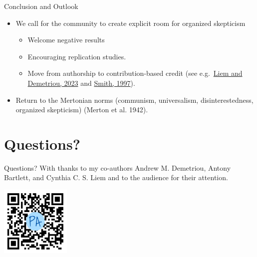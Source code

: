 \documentclass[
  10pt,
  ignorenonframetext,
  aspectratio=169,
  notheorems]{beamer}
\providecommand{\tightlist}{%
  \setlength{\itemsep}{0pt}\setlength{\parskip}{0pt}}\usepackage{longtable,booktabs,array}
\begin{document}
\begin{frame}{Conclusion and Outlook}
\label{conclusion-and-outlook}
\begin{itemize}
\tightlist
\item
  We call for the community to create explicit room for organized
  skepticism

  \begin{itemize}
  \tightlist
  \item
    Welcome negative results
  \item
    Encouraging replication studies.
  \item
    Move from authorship to contribution-based credit (see
    e.g.~\href{https://ieeexplore.ieee.org/stamp/stamp.jsp?tp=&arnumber=10173886}{Liem
    and Demetriou, 2023} and
    \href{https://www.bmj.com/content/315/7110/696.short}{Smith, 1997}).
  \end{itemize}
\item
  Return to the Mertonian norms (communism, universalism,
  disinterestedness, organized skepticism) (Merton et al. 1942).
\end{itemize}
\end{frame}

\section{Questions?}\label{questions}

\begin{frame}{Questions?}
With thanks to my co-authors Andrew M. Demetriou, Antony Bartlett, and
Cynthia C. S. Liem and to the audience for their attention.

\begin{center}
\includegraphics[width=0.25\textwidth,height=\textheight]{../../../../www/images/qr.png}
\end{center}
\end{frame}
\end{document}
